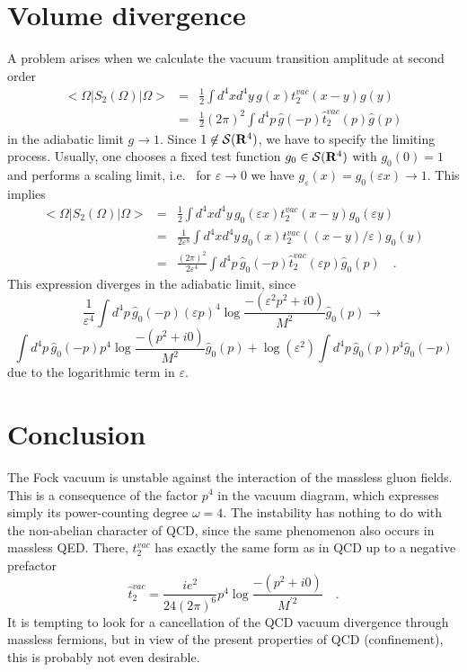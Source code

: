 \documentclass[a4paper,11pt]{article}
\begin{document}
\section{Volume divergence}
A problem arises when we calculate the vacuum transition amplitude
at second order
\begin{eqnarray}
< \Omega | S_2(\Omega) | \Omega> &=& \frac{1}{2}
\int d^4x d^4y \, g(x)t_2^{vac}(x-y)g(y) \nonumber \\
&=& \frac{1}{2}(2 \pi)^2 \int d^4p \, \hat{g}(-p) \hat{t}_2^{vac}(p) \hat{g}
(p)
\end{eqnarray}
in the adiabatic limit $g \rightarrow 1$. Since $1 \not\in
{\cal{S}}({\bf{R}}^4)$, we have to specify the limiting process.
Usually, one chooses a fixed test function $g_0 \in {\cal{S}}({\bf{R}}^4)$
with $g_0(0)=1$ and performs a scaling limit, i.e. \ for $\varepsilon
\rightarrow 0$ we have $g_\varepsilon(x)=g_0(\varepsilon x) \rightarrow 1$.
This implies
\begin{eqnarray}
< \Omega | S_2(\Omega) | \Omega> &=& \frac{1}{2}
\int d^4x d^4y \, g_0(\varepsilon x)t_2^{vac}(x-y)g_0(\varepsilon y)
\nonumber \\
&=& \frac{1}{2 \varepsilon^8} \int d^4xd^4y \,
g_0(x) t_2^{vac}((x-y)/\varepsilon) g_0(y) \nonumber \\
&=&\frac{(2 \pi)^2}{2 \varepsilon^4} \int d^4p \, \hat{g}_0(-p)
\hat{t}_2^{vac}(\varepsilon p) \hat{g}_0(p) \quad .
\end{eqnarray}
This expression diverges in the adiabatic limit, since
\begin{equation}
\frac{1}{\varepsilon^4}\int d^4p \, \hat{g}_0(-p) (\varepsilon p)^4
\log \frac{-(\varepsilon^2p^2+i0)}{M^2} \hat{g}_0(p) \rightarrow
\end{equation}
\begin{equation}
\int d^4p \, \hat{g}_0(-p) p^4
\log \frac{-(p^2+i0)}{M^2} \hat{g}_0(p)
+\log(\varepsilon^2) \int d^4p \, \hat{g}_0(p) p^4
\hat{g}_0(-p) \label{divexp}
\end{equation}
due to the logarithmic term in $\varepsilon$.

\section{Conclusion}
The Fock vacuum is unstable against the interaction
of the massless gluon fields. This is a consequence of the factor
$p^4$ in the vacuum diagram, which expresses simply its
power-counting degree $\omega =4$. 
The instability has nothing to do with the non-abelian character
of QCD, since the same phenomenon also occurs in massless
QED. There, $t_2^{vac}$ has exactly the same form as in QCD
up to a negative prefactor
\begin{equation}
\hat{t}_2^{vac}=\frac{ie^2}{24 (2 \pi)^6} p^4 \log \frac{-(p^2+i0)}{M^{'2}}
\quad .
\end{equation}
It is tempting to look for a cancellation of the QCD vacuum divergence
through massless fermions, but in view of the present properties of QCD
(confinement), this is probably not even desirable.
\end{document}
